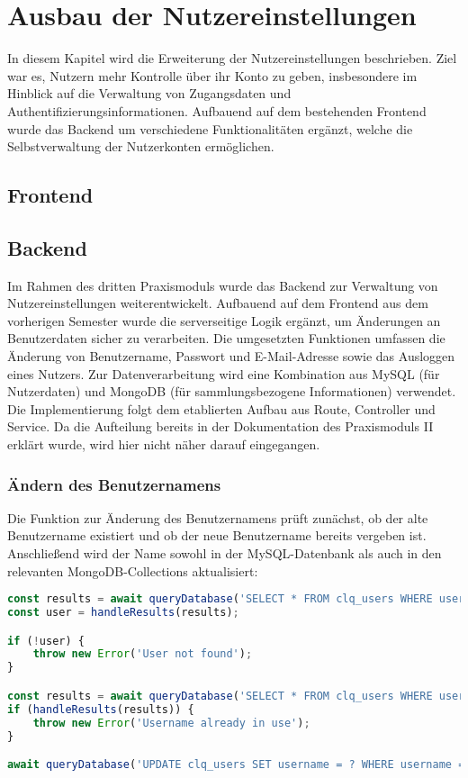 \section{Ausbau der Nutzereinstellungen}\label{sec:ausbau-der-nutzereinstellungen}

In diesem Kapitel wird die Erweiterung der Nutzereinstellungen beschrieben.
Ziel war es, Nutzern mehr Kontrolle über ihr Konto zu geben, insbesondere im Hinblick auf die Verwaltung von Zugangsdaten und Authentifizierungsinformationen.
Aufbauend auf dem bestehenden Frontend wurde das Backend um verschiedene Funktionalitäten ergänzt, welche die Selbstverwaltung der Nutzerkonten ermöglichen.

\subsection{Frontend}\label{subsec:frontend}

\subsection{Backend}\label{subsec:backend}

Im Rahmen des dritten Praxismoduls wurde das Backend zur Verwaltung von Nutzereinstellungen weiterentwickelt.
Aufbauend auf dem Frontend aus dem vorherigen Semester wurde die serverseitige Logik ergänzt, um Änderungen an Benutzerdaten sicher zu verarbeiten.
Die umgesetzten Funktionen umfassen die Änderung von Benutzername, Passwort und E-Mail-Adresse sowie das Ausloggen eines Nutzers.
Zur Datenverarbeitung wird eine Kombination aus MySQL (für Nutzerdaten) und MongoDB (für sammlungsbezogene Informationen) verwendet.
Die Implementierung folgt dem etablierten Aufbau aus Route, Controller und Service.
Da die Aufteilung bereits in der Dokumentation des Praxismoduls II erklärt wurde, wird hier nicht näher darauf eingegangen.

\subsubsection{Ändern des Benutzernamens}\label{subsubsec:username-update}

Die Funktion zur Änderung des Benutzernamens prüft zunächst, ob der alte Benutzername existiert und ob der neue Benutzername bereits vergeben ist.
Anschließend wird der Name sowohl in der MySQL-Datenbank als auch in den relevanten MongoDB-Collections aktualisiert:

\begin{lstlisting}[language=JavaScript, caption=Überprüfung und Update des Usernamens in MySQL]
const results = await queryDatabase('SELECT * FROM clq_users WHERE username = ?', [oldUsername]);
const user = handleResults(results);

if (!user) {
    throw new Error('User not found');
}

const results = await queryDatabase('SELECT * FROM clq_users WHERE username = ?', [newUsername]);
if (handleResults(results)) {
    throw new Error('Username already in use');
}

await queryDatabase('UPDATE clq_users SET username = ? WHERE username = ?', [newUsername, oldUsername]);
\end{lstlisting}

